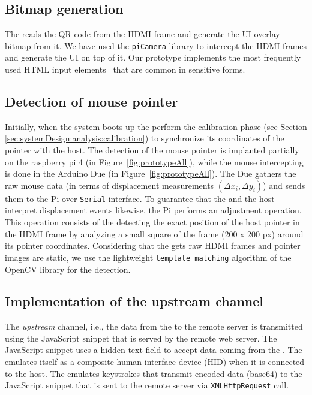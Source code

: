 \subsection{Bitmap generation}
\label{sec:prototype:impl:bitmap}
%
The \device reads the QR code from the HDMI frame and generate the UI overlay bitmap from it. We have used the \texttt{piCamera} library to intercept the HDMI frames and generate the UI on top of it. Our \name prototype implements the most frequently used HTML input elements~\cite{html_elements} that are common in sensitive forms. 

\subsection{Detection of mouse pointer}
\label{sec:prototype:impl:mouse}
%
Initially, when the system boots up the \device perform the calibration phase (see Section \ref{sec:systemDesign:analysis:calibration}) to synchronize its coordinates of the pointer with the host. The detection of the mouse pointer is implanted partially on the raspberry pi 4 (\six in Figure~\ref{fig:prototypeAll}), while the mouse intercepting is done in the Arduino Due (\three in Figure~\ref{fig:prototypeAll}). The Due gathers the raw mouse data (in terms of displacement measurements $(\Delta x_i, \Delta y_i)$) and sends them to the Pi over \texttt{Serial} interface.  To guarantee that the \device and the host interpret displacement events likewise, the Pi performs an adjustment operation. This operation consists of the \device detecting the exact position of the host pointer in the HDMI frame by analyzing a small square of the frame (200 x 200 px) around its pointer coordinates. Considering that the \device gets raw HDMI frames and pointer images are static, we use the lightweight \texttt{template matching} algorithm of the OpenCV library for the detection.

\subsection{Implementation of the upstream channel}
\label{sec:prototype:impl:upstream}
%
The \emph{upstream} channel, i.e., the data from the \device to the remote server is transmitted using the \name JavaScript snippet that is served by the remote web server. The \name JavaScript snippet uses a hidden text field to accept data coming from the \device. The \device emulates itself as a composite human interface device (HID) when it is connected to the host. The \device emulates keystrokes that transmit encoded data (base64) to the \name JavaScript snippet that is sent to the remote server via \texttt{XMLHttpRequest} call.

